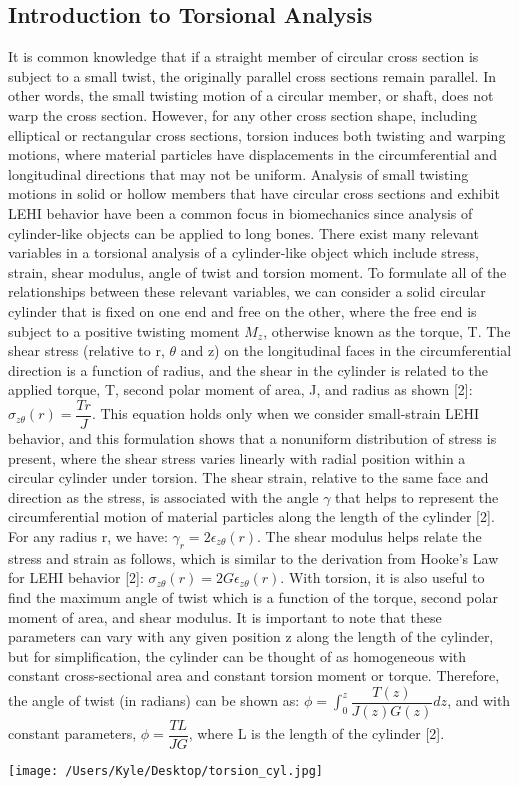 \documentclass[12pt]{article}
\begin{document}
\subsection*{Introduction to Torsional Analysis}
It is common knowledge that if a straight member of circular cross section is subject to a small twist, the originally parallel cross sections remain parallel. In other words, the small twisting motion of a circular member, or shaft, does not warp the cross section. However, for any other cross section shape, including elliptical or rectangular cross sections, torsion induces both twisting and warping motions, where material particles have displacements in the circumferential and longitudinal directions that may not be uniform. Analysis of small twisting motions in solid or hollow members that have circular
cross sections and exhibit LEHI behavior have been a common focus in biomechanics since analysis of cylinder-like objects can be applied to long bones. There exist many relevant variables in a torsional analysis of a cylinder-like object which include stress, strain, shear modulus, angle of twist and torsion moment. To formulate all of the relationships between these relevant variables, we can consider a solid circular cylinder that is fixed on one end
and free on the other, where the free end is subject to a positive twisting moment $M_z$, otherwise known as the torque, T. The shear stress (relative to r, $\theta$ and z) on the longitudinal faces in the circumferential direction is a function of radius, and the shear in the cylinder is related to the applied torque, T, second polar moment of area, J, and radius as shown [2]: $\sigma_{z\theta}(r)=\dfrac{Tr}{J}$. This equation holds only when we consider small-strain LEHI behavior, and this formulation shows that a nonuniform distribution of stress is present, where the shear stress varies linearly with radial position within a circular cylinder under torsion. The shear strain, relative to the same face and direction as the stress, is associated with the angle $\gamma$ that helps to represent the circumferential motion of material particles along the length of the cylinder [2]. For any radius r, we have: $\gamma_r=2\epsilon_{z\theta}(r)$. The shear modulus helps relate the stress and strain as follows, which is similar to the derivation from Hooke's Law for LEHI behavior [2]: $\sigma_{z\theta}(r)=2G\epsilon_{z\theta}(r)$. With torsion, it is also useful to find the maximum angle of twist which is a function of the torque, second polar moment of area, and shear modulus. It is important to note that these parameters can vary with any given position z along the length of the cylinder, but for simplification, the cylinder can be thought of as homogeneous with constant cross-sectional area and constant torsion moment or torque. Therefore, the angle of twist (in radians) can be shown as: $\phi=\int_0^z\dfrac{T(z)}{J(z)G(z)}dz$, and with constant parameters, $\phi=\dfrac{TL}{JG}$, where L is the length of the cylinder [2].
\begin{center}
   \texttt{[image: /Users/Kyle/Desktop/torsion\_cyl.jpg]}
\end{center}
\end{document}
